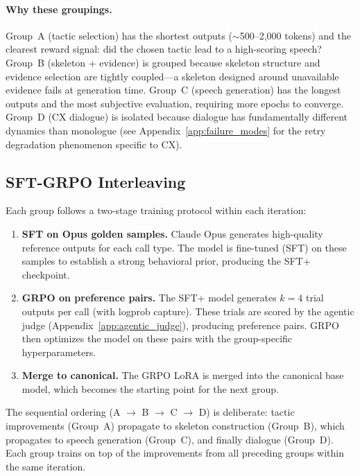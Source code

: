 \paragraph{Why these groupings.}
Group~A (tactic selection) has the shortest outputs ($\sim$500--2,000
tokens) and the clearest reward signal: did the chosen tactic lead to
a high-scoring speech? Group~B (skeleton + evidence) is grouped because
skeleton structure and evidence selection are tightly coupled---a skeleton
designed around unavailable evidence fails at generation time. Group~C
(speech generation) has the longest outputs and the most subjective
evaluation, requiring more epochs to converge. Group~D (CX dialogue)
is isolated because dialogue has fundamentally different dynamics than
monologue (see Appendix~\ref{app:failure_modes} for the retry
degradation phenomenon specific to CX).

\subsection{SFT-GRPO Interleaving}

Each group follows a two-stage training protocol within each iteration:

\begin{enumerate}
\item \textbf{SFT on Opus golden samples.} Claude Opus generates
    high-quality reference outputs for each call type. The model is
    fine-tuned (SFT) on these samples to establish a strong behavioral
    prior, producing the SFT+ checkpoint.

\item \textbf{GRPO on preference pairs.} The SFT+ model generates
    $k{=}4$ trial outputs per call (with logprob capture). These trials
    are scored by the agentic judge (Appendix~\ref{app:agentic_judge}),
    producing preference pairs. GRPO then optimizes the model on these
    pairs with the group-specific hyperparameters.

\item \textbf{Merge to canonical.} The GRPO LoRA is merged into the
    canonical base model, which becomes the starting point for the next
    group.
\end{enumerate}

The sequential ordering (A $\rightarrow$ B $\rightarrow$ C $\rightarrow$ D)
is deliberate: tactic improvements (Group~A) propagate to skeleton
construction (Group~B), which propagates to speech generation (Group~C),
and finally dialogue (Group~D). Each group trains on top of the
improvements from all preceding groups within the same iteration.

